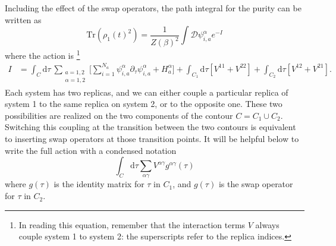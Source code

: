 \documentclass[11pt]{article}
\newcommand{\be}{\begin{equation}}
\newcommand{\ee}{\end{equation}}
\numberwithin{equation}{section}
\def\tr{\text{Tr}}
\begin{document}
Including the effect of the swap operators, the path integral for the purity can be written as 
\be
\tr\left(\rho_1(t)^2\right)= \frac{1}{Z(\beta)^2}\int \mathcal{D}\psi_{i,a}^\alpha e^{-I}\label{toAVG}
\ee
where the action is \cite{Gu:2017njx}\footnote{In reading this equation, remember that the interaction terms $V$ always couple system 1 to system 2: the superscripts refer to the replica indices.}
\begin{align}
I &= \int_C \mathrm{d}\tau \ \sum_{\substack{a = 1,2 \\ \alpha = 1,2}}\Bigg[\sum_{i = 1}^{N_a}\psi_{i,a}^\alpha \partial_\tau \psi_{i,a}^\alpha + H_{a}^\alpha \Bigg]+ \int_{C_1}\mathrm{d}\tau \left[V^{11} + V^{22}\right] + \int_{C_2}\mathrm{d}\tau \left[V^{12} + V^{21} \right].
\end{align}
Each system has two replicas, and we can either couple a particular replica of system 1 to the same replica on system 2, or to the opposite one. These two possibilities are realized on the two components of the contour $C = C_1 \cup C_2$. Switching this coupling at the transition between the two contours is equivalent to inserting swap operators at those transition points. It will be helpful below to write the full action with a condensed notation
\be
\int_C \mathrm{d}\tau \sum_{\alpha\gamma}V^{\alpha\gamma}g^{\alpha\gamma}(\tau)
\ee
where $g(\tau)$ is the identity matrix for $\tau$ in $C_1$, and $g(\tau)$ is the swap operator for $\tau$ in $C_2$.
\end{document}

